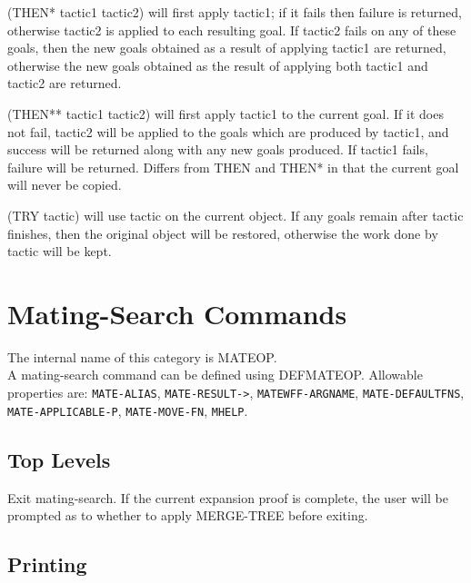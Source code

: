 \begin{description}
\item[THEN*]  
(THEN* tactic1 tactic2) will first apply tactic1; if it fails
 then failure is returned, otherwise tactic2 is applied to each resulting
 goal.  If tactic2 fails on any of these goals, then the new goals obtained
 as a result of applying tactic1 are returned, otherwise the new goals
 obtained as the result of applying both tactic1 and tactic2 are returned.

\item[THEN**]  
(THEN** tactic1 tactic2) will first apply tactic1 to the current
goal.  If it does not fail, tactic2 will be applied to the goals which are
produced by tactic1, and success will be returned along with any new goals
produced.  If tactic1 fails, failure will be returned.  Differs from THEN
and THEN* in that the current goal will never be copied.

\item[TRY]  
(TRY tactic) will use tactic on the current object.  If any goals
remain after tactic finishes, then the original object will be restored,
otherwise the work done by tactic will be kept.
\item
\end{description}
\chapter{Mating-Search Commands}
The internal name of this category is 
MATEOP.\\
A mating-search command can be defined using DEFMATEOP.
Allowable properties are: \texttt{MATE-ALIAS}, \texttt{MATE-RESULT->}, \texttt{MATEWFF-ARGNAME}, \texttt{MATE-DEFAULTFNS}, \texttt{MATE-APPLICABLE-P}, \texttt{MATE-MOVE-FN}, \texttt{MHELP}.

\section{Top Levels}

\begin{description} 
\item[LEAVE]  
Exit mating-search.  If the current expansion proof is
complete, the user will be prompted as to whether to apply MERGE-TREE 
before exiting.
\item
\end{description}

\section{Printing}

